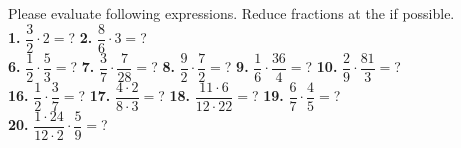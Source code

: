 \documentclass[a4paper]{article}
\begin{document}
\begin{Large}

Please evaluate following expressions. Reduce fractions at the if possible. \\[0.75cm]
		
\textbf{1.} $\dfrac{3}{2} \cdot 2 =$? \hspace{0.2cm}
\textbf{2.} $\dfrac{8}{6} \cdot 3 =$? \\[0.75cm]
		
\textbf{6.} $\dfrac{1}{2} \cdot \dfrac{5}{3} =$? \hspace{0.2cm}
\textbf{7.} $\dfrac{3}{7} \cdot \dfrac{7}{28} =$? \hspace{0.2cm}
\textbf{8.} $\dfrac{9}{2} \cdot \dfrac{7}{2} =$? \hspace{0.2cm}
\textbf{9.} $\dfrac{1}{6} \cdot \dfrac{36}{4} =$? \hspace{0.2cm}
\textbf{10.} $\dfrac{2}{9} \cdot \dfrac{81}{3} =$? \\[0.75cm]

\textbf{16.} $\dfrac{1}{2} \cdot \dfrac{3}{7} =$? \hspace{0.2cm}
\textbf{17.} $\dfrac{4 \cdot 2}{8 \cdot 3}=$? \hspace{0.2cm}
\textbf{18.} $\dfrac{11 \cdot 6}{12 \cdot 22}=$? \hspace{0.2cm}
\textbf{19.} $\dfrac{6}{7} \cdot \dfrac{4}{5} =$?  \\[0.75cm]
\textbf{20.} $\dfrac{1 \cdot 24}{12 \cdot 2} \cdot \dfrac{5}{9} =$? \hspace{0.2cm}

\end{Large}
\end{document}

